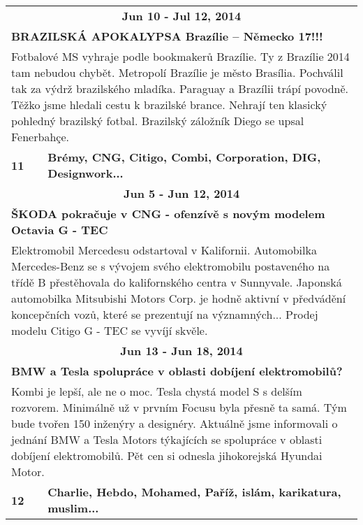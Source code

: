 \begin{tabularx}{\linewidth}{l l}
                \multicolumn{2}{c}{\bf Jun 10 - Jul 12, 2014} \\
                \multicolumn{2}{p{\linewidth}}{\bf BRAZILSKÁ APOKALYPSA Brazílie – Německo 17!!!} \\
                \multicolumn{2}{p{\linewidth}}{Fotbalové MS vyhraje podle bookmakerů Brazílie. Ty z Brazílie 2014 tam nebudou chybět. Metropolí Brazílie je město Brasília. Pochválil tak za výdrž brazilského mladíka. Paraguay a Brazílii trápí povodně.  Těžko jsme hledali cestu k brazilské brance.  Nehrají ten klasický pohledný brazilský fotbal. Brazilský záložník Diego se upsal Fenerbahçe.} \\ \midrule
                [1.5pt]

            \bf 11 & \bf Brémy, CNG, Citigo, Combi, Corporation, DIG, Designwork... \\ \midrule
            
                \multicolumn{2}{c}{\bf Jun 5 - Jun 12, 2014} \\
                \multicolumn{2}{p{\linewidth}}{\bf ŠKODA pokračuje v CNG - ofenzívě s novým modelem Octavia G - TEC} \\
                \multicolumn{2}{p{\linewidth}}{Elektromobil Mercedesu odstartoval v Kalifornii. Automobilka Mercedes-Benz se s vývojem svého elektromobilu postaveného na třídě B přestěhovala do kalifornského centra v Sunnyvale. Japonská automobilka Mitsubishi Motors Corp. je hodně aktivní v předvádění koncepčních vozů, které se prezentují na významných... Prodej modelu Citigo G - TEC se vyvíjí skvěle.} \\ \midrule
                
                \multicolumn{2}{c}{\bf Jun 13 - Jun 18, 2014} \\
                \multicolumn{2}{p{\linewidth}}{\bf BMW a Tesla spolupráce v oblasti dobíjení elektromobilů?} \\
                \multicolumn{2}{p{\linewidth}}{Kombi je lepší, ale ne o moc. Tesla chystá model S s delším rozvorem. Minimálně už v prvním Focusu byla přesně ta samá. Tým bude tvořen 150 inženýry a designéry. Aktuálně jsme informovali o jednání BMW a Tesla Motors týkajících se spolupráce v oblasti dobíjení elektromobilů. Pět cen si odnesla jihokorejská Hyundai Motor.} \\ \midrule
                [1.5pt]

            \bf 12 & \bf Charlie, Hebdo, Mohamed, Paříž, islám, karikatura, muslim... \\ \midrule
            

\end{tabularx}
